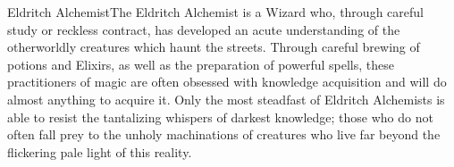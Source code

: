 \documentclass[././main.tex]{subfiles}
\begin{document}
\begin{dndclass}{Eldritch Alchemist}{The Eldritch Alchemist is a Wizard who, through careful study or reckless contract, has developed an acute understanding of the otherworldly creatures which haunt the streets. Through careful brewing of potions and Elixirs, as well as the preparation of powerful spells, these practitioners of magic are often obsessed with knowledge acquisition and will do almost anything to acquire it. Only the most steadfast of Eldritch Alchemists is able to resist the tantalizing whispers of darkest knowledge; those who do not often fall prey to the unholy machinations of creatures who live far beyond the flickering pale light of this reality.}


\end{dndclass}
\end{document}
